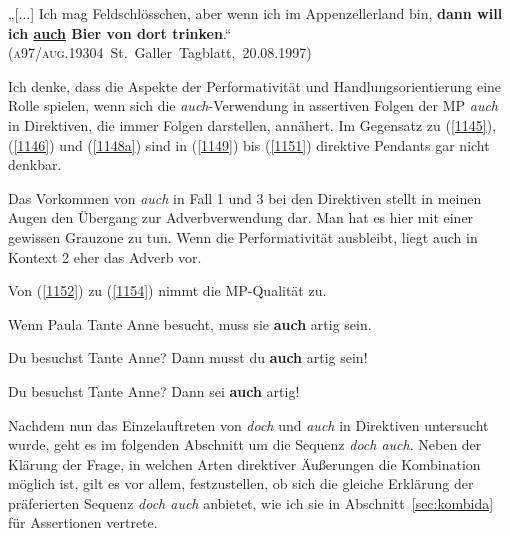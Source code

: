\begin{exe}
	\ex\label{1151} 

	{„[...] Ich mag Feldschlösschen, aber wenn ich im Appenzellerland bin, \textbf{dann will ich \ul{auch} Bier von dort trinken}.“   
	\newline\hbox{}\hfill\hbox{(\textsc{a97/aug.19304} St. Galler Tagblatt, 20.08.1997)}}\\
\end{exe}
Ich denke, dass die Aspekte der Performativität und Handlungsorientierung eine Rolle spielen, wenn sich die \textit{auch}-Verwendung in assertiven Folgen der MP \textit{auch} in Direktiven, die immer Folgen darstellen, annähert. Im Gegensatz zu (\ref{1145}), (\ref{1146}) und (\ref{1148a}) sind in (\ref{1149}) bis (\ref{1151}) direktive Pendants gar nicht denkbar.

Das Vorkommen von \textit{auch} in Fall 1 und 3 bei den Direktiven stellt in meinen Augen den Übergang zur Adverbverwendung dar. Man hat es hier mit einer gewissen Grauzone zu tun. Wenn die Performativität ausbleibt, liegt auch in Kontext 2 eher das Adverb vor. 

Von (\ref{1152}) zu (\ref{1154}) nimmt die MP-Qualität zu.
	
\begin{exe}
	\ex\label{1152} 
	Wenn Paula Tante Anne besucht, muss sie \textbf{auch} artig sein.
\end{exe}	
	
\begin{exe}
	\ex\label{1153} 
	Du besuchst Tante Anne? Dann musst du \textbf{auch} artig sein!
\end{exe}	

\begin{exe}
	\ex\label{1154} 
	Du besuchst Tante Anne? Dann sei \textbf{auch} artig!
\end{exe}	
Nachdem nun das Einzelauftreten von \textit{doch} und \textit{auch} in Direktiven untersucht wurde, geht es im folgenden Abschnitt um die Sequenz \textit{doch auch}. Neben der Klärung der Frage, in welchen Arten direktiver Äußerungen die Kombination möglich ist, gilt es vor allem, festzustellen, ob sich die glei\-che Erklärung der präferierten Sequenz \textit{doch auch} anbietet, wie ich sie in Abschnitt~\ref{sec:kombida} für Assertionen vertrete. 


